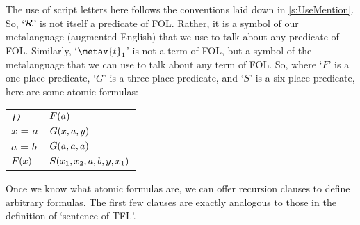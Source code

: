 The use of script letters here follows the conventions laid down in \cref{s:UseMention}. So, `$\mathcal{R}$' is not itself a predicate of FOL. Rather, it is a symbol of our metalanguage (augmented English) that we use to talk about any predicate of FOL. Similarly, `$\metav{t}_1$' is not a term of FOL, but a symbol of the metalanguage that we can use to talk about any term of FOL. So, where `$F$' is a one-place predicate, `$G$' is a three-place predicate, and `$S$' is a six-place predicate, here are some atomic formulas:
	\begin{center}
		\begin{tabular}{l@{\qquad\qquad}l}
		$D$ & $F(a)$\\
		$x = a$ & $G(x,a,y)$\\
		$a = b$ & $G(a,a,a)$\\
		$F(x)$ & $S(x_1, x_2, a, b, y, x_1)$
	\end{tabular}
\end{center}
Once we know what atomic formulas are, we can offer recursion clauses to define arbitrary formulas. The first few clauses are exactly analogous to those in the definition of `sentence of TFL'.
